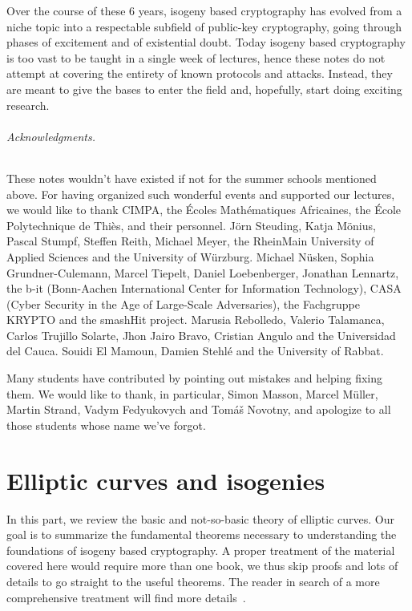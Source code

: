 \documentclass[10pt]{article}
\theoremstyle{plain}
\theoremstyle{definition}
\begin{document}
Over the course of these 6 years, isogeny based cryptography has
evolved from a niche topic into a respectable subfield of public-key
cryptography, going through phases of excitement and of existential
doubt. %
Today isogeny based cryptography is too vast to be taught in a single
week of lectures, hence these notes do not attempt at covering the
entirety of known protocols and attacks. %
Instead, they are meant to give the bases to enter the field and,
hopefully, start doing exciting research.

\paragraph{Acknowledgments.}
These notes wouldn't have existed if not for the summer schools
mentioned above. %
For having organized such wonderful events and supported our lectures,
we would like to thank CIMPA, the Écoles Mathématiques Africaines, the
École Polytechnique de Thiès, and their personnel. %
Jörn Steuding, Katja Mönius, Pascal Stumpf, Steffen Reith, Michael
Meyer, the RheinMain University of Applied Sciences and the University
of Würzburg. %
Michael Nüsken, Sophia Grundner-Culemann, Marcel Tiepelt, Daniel
Loebenberger, Jonathan Lennartz, the b-it (Bonn-Aachen International
Center for Information Technology), CASA (Cyber Security in the Age of
Large-Scale Adversaries), the Fachgruppe KRYPTO and the smashHit
project. %
Marusia Rebolledo, Valerio Talamanca, Carlos Trujillo Solarte, Jhon
Jairo Bravo, Cristian Angulo and the Universidad del Cauca. %
Souidi El Mamoun, Damien Stehlé and the University of Rabbat.

Many students have contributed by pointing out mistakes and helping
fixing them. %
We would like to thank, in particular, Simon Masson, Marcel Müller,
Martin Strand, Vadym Fedyukovych and Tomáš Novotny, and apologize
to all those students whose name we've forgot.

\clearpage
{
  \hypersetup{linkcolor=black}
  \setcounter{tocdepth}{1}
  \tableofcontents
}


\clearpage
\part{Elliptic curves and isogenies}

In this part, we review the basic and not-so-basic theory of elliptic
curves. %
Our goal is to summarize the fundamental theorems necessary to
understanding the foundations of isogeny based cryptography. %
A proper treatment of the material covered here would require more
than one book, we thus skip proofs and lots of details to go straight
to the useful theorems. %
The reader in search of a more comprehensive treatment will find more
details~\cite{silverman:elliptic,silverman:advanced,lang1987elliptic,neukirch2013algebraic}. %
\end{document}
